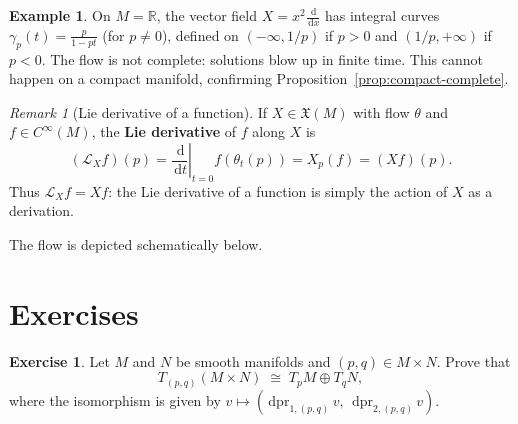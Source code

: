 \documentclass[12pt,a4paper,openany]{book}
\theoremstyle{definition}
\newtheorem{example}[theorem]{Example}
\newtheorem{exercise}{Exercise}[chapter]
\theoremstyle{remark}
\newtheorem{remark}[theorem]{Remark}
\newcommand{\R}{\mathbb{R}}
\newcommand{\dd}{\,\mathrm{d}}
\begin{document}
\begin{example}\label{ex:flow-incomplete}%
On $M = \R$, the vector field $X = x^2 \frac{\dd}{\dd x}$ has integral
curves $\gamma_p(t) = \frac{p}{1 - pt}$ (for $p \neq 0$), defined on
$(-\infty, 1/p)$ if $p > 0$ and $(1/p, +\infty)$ if $p < 0$.  The flow
is not complete: solutions blow up in finite time.  This cannot happen on a
compact manifold, confirming Proposition~\ref{prop:compact-complete}.
\end{example}

\begin{remark}[Lie derivative of a function]\label{rem:lie-derivative-fn}%
If $X \in \mathfrak{X}(M)$ with flow $\theta$ and $f \in C^\infty(M)$,
the \textbf{Lie derivative} of $f$ along $X$ is
\[
  (\mathcal{L}_X f)(p)
  = \left.\frac{\dd}{\dd t}\right|_{t=0} f(\theta_t(p))
  = X_p(f) = (Xf)(p).
\]
Thus $\mathcal{L}_X f = Xf$: the Lie derivative of a function is simply
the action of $X$ as a derivation.
\end{remark}

The flow is depicted schematically below.

\begin{center}
\end{center}

\section{Exercises}

\begin{exercise}\label{exo:tangent-product}%
Let $M$ and $N$ be smooth manifolds and $(p, q) \in M \times N$.
Prove that
\[
  T_{(p,q)}(M \times N) \;\cong\; T_pM \oplus T_qN,
\]
where the isomorphism is given by
$v \mapsto (\dd\mathrm{pr}_{1,(p,q)}\, v,\; \dd\mathrm{pr}_{2,(p,q)}\, v)$.
\end{exercise}
\end{document}
